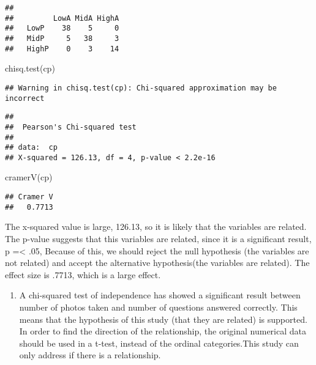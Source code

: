 \documentclass[
]{article}
\newenvironment{Shaded}{\begin{snugshade}}{\end{snugshade}}
\newcommand{\FunctionTok}[1]{\textcolor[rgb]{0.00,0.00,0.00}{#1}}
\newcommand{\NormalTok}[1]{#1}
\providecommand{\tightlist}{%
  \setlength{\itemsep}{0pt}\setlength{\parskip}{0pt}}
\begin{document}
\begin{verbatim}
##        
##         LowA MidA HighA
##   LowP    38    5     0
##   MidP     5   38     3
##   HighP    0    3    14
\end{verbatim}

\begin{Shaded}
\begin{Highlighting}[]
\FunctionTok{chisq.test}\NormalTok{(cp)}
\end{Highlighting}
\end{Shaded}

\begin{verbatim}
## Warning in chisq.test(cp): Chi-squared approximation may be incorrect
\end{verbatim}

\begin{verbatim}
## 
##  Pearson's Chi-squared test
## 
## data:  cp
## X-squared = 126.13, df = 4, p-value < 2.2e-16
\end{verbatim}

\begin{Shaded}
\begin{Highlighting}[]
\FunctionTok{cramerV}\NormalTok{(cp)}
\end{Highlighting}
\end{Shaded}

\begin{verbatim}
## Cramer V 
##   0.7713
\end{verbatim}

The x-squared value is large, 126.13, so it is likely that the variables
are related. The p-value suggests that this variables are related, since
it is a significant result, p =\textless{} .05, Because of this, we
should reject the null hypothesis (the variables are not related) and
accept the alternative hypothesis(the variables are related). The effect
size is .7713, which is a large effect.

\begin{enumerate}
\def\labelenumi{\alph{enumi})}
\setcounter{enumi}{3}
\tightlist
\item
  A chi-squared test of independence has showed a significant result
  between number of photos taken and number of questions answered
  correctly. This means that the hypothesis of this study (that they are
  related) is supported. In order to find the direction of the
  relationship, the original numerical data should be used in a t-test,
  instead of the ordinal categories.This study can only address if there
  is a relationship.
\end{enumerate}
\end{document}
